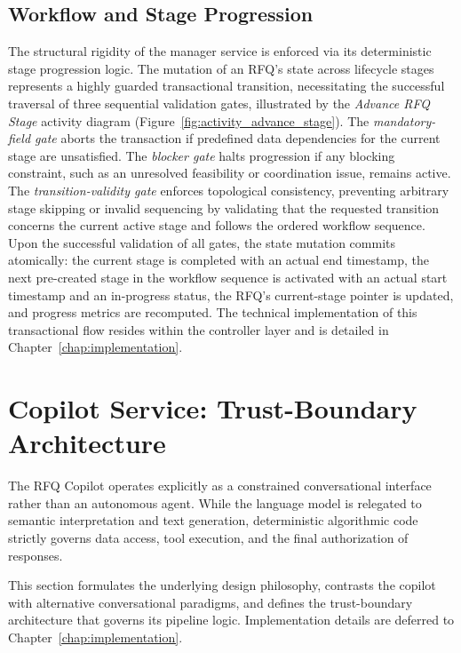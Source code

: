 \subsection{Workflow and Stage Progression}
The structural rigidity of the manager service is enforced via its deterministic stage progression logic. The mutation of an RFQ's state across lifecycle stages represents a highly guarded transactional transition, necessitating the successful traversal of three sequential validation gates, illustrated by the \textit{Advance RFQ Stage} activity diagram (Figure~\ref{fig:activity_advance_stage}). The \textit{mandatory-field gate} aborts the transaction if predefined data dependencies for the current stage are unsatisfied. The \textit{blocker gate} halts progression if any blocking constraint, such as an unresolved feasibility or coordination issue, remains active. The \textit{transition-validity gate} enforces topological consistency, preventing arbitrary stage skipping or invalid sequencing by validating that the requested transition concerns the current active stage and follows the ordered workflow sequence. Upon the successful validation of all gates, the state mutation commits atomically: the current stage is completed with an actual end timestamp, the next pre-created stage in the workflow sequence is activated with an actual start timestamp and an in-progress status, the RFQ's current-stage pointer is updated, and progress metrics are recomputed. The technical implementation of this transactional flow resides within the controller layer and is detailed in Chapter~\ref{chap:implementation}.

\section{Copilot Service: Trust-Boundary Architecture}\label{sec:trust_boundary}
The RFQ Copilot operates explicitly as a constrained conversational interface rather than an autonomous agent. While the language model is relegated to semantic interpretation and text generation, deterministic algorithmic code strictly governs data access, tool execution, and the final authorization of responses.

This section formulates the underlying design philosophy, contrasts the copilot with alternative conversational paradigms, and defines the trust-boundary architecture that governs its pipeline logic. Implementation details are deferred to Chapter~\ref{chap:implementation}.

